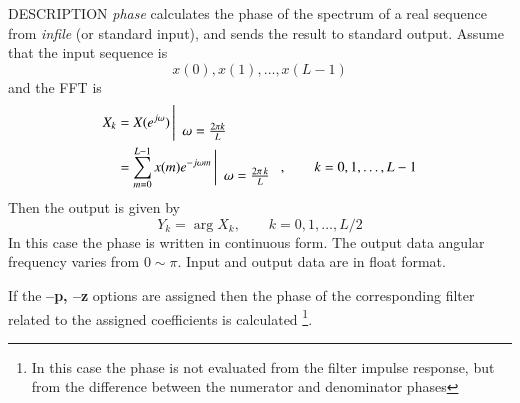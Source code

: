 \begin{synopsis}
\item[phase] [ --l $L$ ] [ --p {\em pfile} ] [ --z {\em zfile} ]
             [ --m $M$ ] [ --n $N$ ] [ --u ] [ {\em infile} ]
\end{synopsis}

\begin{qsection}{DESCRIPTION}
{\em phase} calculates the phase of the spectrum of a real sequence 
from {\em infile} (or standard input), 
and sends the result to standard output.
Assume that the input sequence is
\begin{displaymath}
  x(0), x(1), \dots, x(L-1)
\end{displaymath}
and the FFT is
\begin{align}
  X_k &= X(e^{j\omega}) \left|
	\begin{array}{c}
	\\
        \omega=\frac{2\pi k}{L}
	\end{array}
    \right. \notag \\
         &= \sum_{m=0}^{L-1}x(m)e^{-j\omega m} \left|
	\begin{array}{c}
	\\
        \omega=\frac{2\pi\, k}{L}
	\end{array}
    \right.,\qquad k=0,1,\dots,L-1 \notag
\end{align}
Then the output is given by
\begin{displaymath}
  Y_k=\arg X_k, \qquad k=0,1,\dots,L/2
\end{displaymath}
In this case the phase is written in continuous form.
The output data angular frequency varies from $0\sim \pi$.
Input and output data are in float format.
\par
If the {\bf --p, --z} options are assigned
then the phase of the corresponding filter related to
the assigned coefficients is calculated
\footnote{
In this case the phase is not evaluated from the filter
impulse response, but from
the difference between the numerator and denominator phases}.
\end{qsection}

